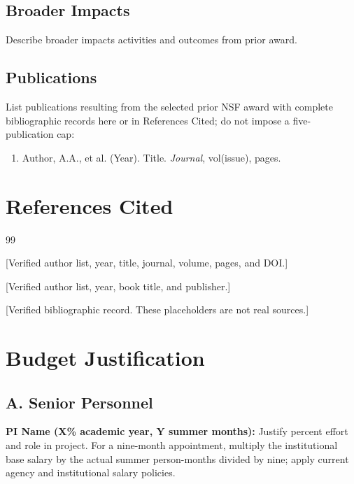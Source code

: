 \documentclass[11pt,letterpaper]{article}
\begin{document}
\subsection{Broader Impacts}
Describe broader impacts activities and outcomes from prior award.

\subsection{Publications}
List publications resulting from the selected prior NSF award with complete bibliographic records here or in References Cited; do not impose a five-publication cap:
\begin{enumerate}
    \item Author, A.A., et al. (Year). Title. \textit{Journal}, vol(issue), pages.
\end{enumerate}

\newpage


\section*{References Cited}

\begin{thebibliography}{99}

[Verified author list, year, title, journal, volume, pages, and DOI.]

[Verified author list, year, book title, and publisher.]

[Verified bibliographic record. These placeholders are not real sources.]


\end{thebibliography}

\newpage


\section*{Budget Justification}

\subsection*{A. Senior Personnel}
\textbf{PI Name (X\% academic year, Y summer months):} Justify percent effort and role in project. For a nine-month appointment, multiply the institutional base salary by the actual summer person-months divided by nine; apply current agency and institutional salary policies.
\end{document}
